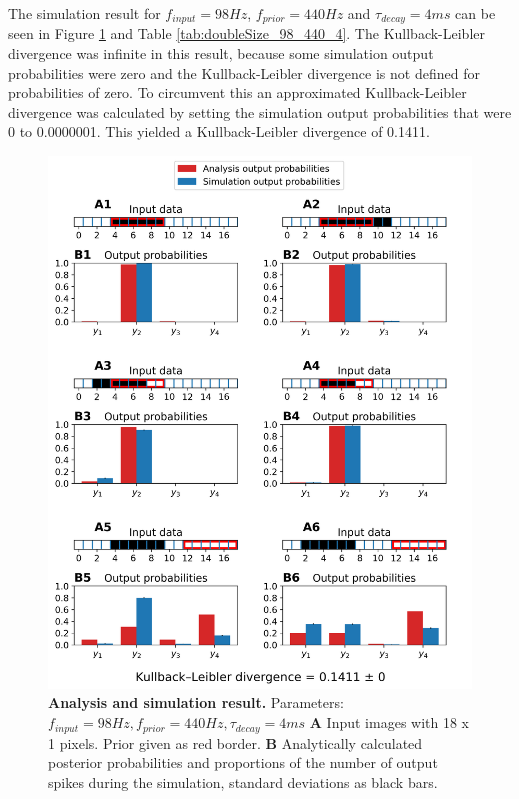The simulation result for $f_{input} = 98 Hz$, $f_{prior} = 440 Hz$ and $\tau_{decay} = 4 ms$ can be seen in Figure \ref{fig:doubleSize_98_440_4} and Table \ref{tab:doubleSize_98_440_4}. The Kullback-Leibler divergence was infinite in this result, because some simulation output probabilities were zero and the Kullback-Leibler divergence is not defined for probabilities of zero. To circumvent this an approximated Kullback-Leibler divergence was calculated by setting the simulation output probabilities that were 0 to 0.0000001. This yielded a Kullback-Leibler divergence of 0.1411.
\begin{figure}
  \includegraphics[width=\linewidth]{figures/1D/doubleSize/doubleSize_98_440_4.png}
      \caption{\textbf{Analysis and simulation result. } Parameters: $f_{input} = 98 Hz, f_{prior} = 440 Hz, \tau_{decay} = 4 ms$ \textbf{A} Input images with 18 x 1 pixels. Prior given as red border. \textbf{B} Analytically calculated posterior probabilities and proportions of the number of output spikes during the simulation, standard deviations as black bars.}
  \label{fig:doubleSize_98_440_4}
\end{figure}

